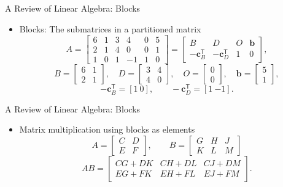 \documentclass[aspectratio=169,hyperref,UTF8,CJK]{beamer}
\newcommand{\trans}{\mathsf{T}}
\newcommand{\vect}[1]{\boldsymbol{#1}}
\begin{document}
\begin{frame}{A Review of Linear Algebra: Blocks}
  \small
  \begin{itemize}
    \item Blocks: The submatrices in a partitioned matrix
      \begin{equation*}
        A=\begin{bmatrix}
          6&1&3&4&0&5\\
          2&1&4&0&0&1\\
          1&0&1&-1&1&0
        \end{bmatrix}
        =\begin{bmatrix}B&D&O&\vect{b}\\-\vect{c}_B^{\trans}&-\vect{c}_D^{\trans}&1&0\end{bmatrix},
      \end{equation*}
      \begin{equation*}
        B=\begin{bmatrix}6&1\\2&1\end{bmatrix},\quad
        D=\begin{bmatrix}3&4\\4&0\end{bmatrix},\quad
        O=\begin{bmatrix}0\\0\end{bmatrix},\quad
        \vect{b}=\begin{bmatrix}5\\1\end{bmatrix},
      \end{equation*}
      \begin{equation*}
        -\vect{c}_B^{\trans}=[1\ 0],\qquad-\vect{c}_D^{\trans}=[1\ {-1}].
      \end{equation*}
  \end{itemize}
\end{frame}

\begin{frame}{A Review of Linear Algebra: Blocks}
  \begin{itemize}
    \item Matrix multiplication using blocks as elements
      \begin{equation*}
        A=\begin{bmatrix}C&D\\E&F\end{bmatrix},\qquad
        B=\begin{bmatrix}G&H&J\\K&L&M\end{bmatrix}
      \end{equation*}
      \begin{equation*}
        AB=\begin{bmatrix}
          CG+DK&CH+DL&CJ+DM\\
          EG+FK&EH+FL&EJ+FM
        \end{bmatrix}.
      \end{equation*}
  \end{itemize}
\end{frame}
\end{document}
